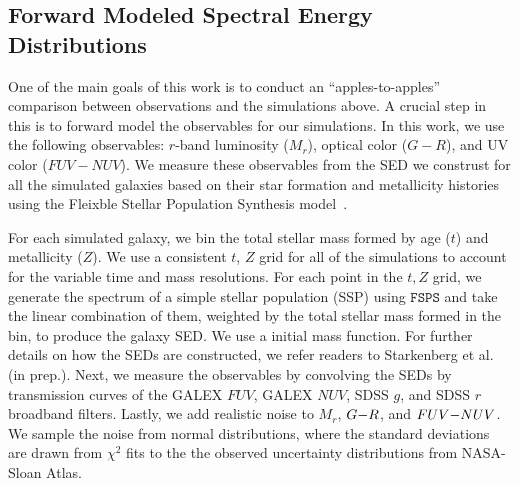 \subsection{Forward Modeled Spectral Energy Distributions} \label{sec:fm} 
One of the main goals of this work is to conduct an ``apples-to-apples'' comparison
between observations and the simulations above. A crucial step in this is to
forward model the observables for our simulations. In this work, we use the
following observables: $r$-band luminosity ($M_r$), optical color ($G-R$), and 
UV color ($FUV-NUV$). We measure these observables from the SED we construst
for all the simulated galaxies based on their star formation and metallicity 
histories using the Fleixble Stellar Population Synthesis
model~\citep[$\mathtt{FSPS}$;][]{conroy2009, conroy2010}. 

For each simulated galaxy, we bin the total stellar mass formed by age ($t$)
and metallicity ($Z$). We use a consistent $t$, $Z$ grid for all of the simulations
to account for the variable time and mass resolutions. For each point in the
$t, Z$ grid, we generate the spectrum of a simple stellar population (SSP)
using $\mathtt{FSPS}$ and take the linear combination of them, weighted by 
the total stellar mass formed in the bin, to produce the galaxy SED. We use a
\cite{chabrier2003} initial mass function. For further
details on how the SEDs are constructed, we refer readers to Starkenberg et al.
(in prep.). Next, we measure the observables by convolving the SEDs by
transmission curves of the GALEX $FUV$, GALEX $NUV$, SDSS $g$, and SDSS $r$
broadband filters. Lastly, we add realistic noise to $M_r$, $G{-}R$, and $FUV{-}NUV$. 
We sample the noise from normal distributions, where the standard deviations 
are drawn from $\chi^2$ fits to the the observed uncertainty distributions from 
NASA-Sloan Atlas.

